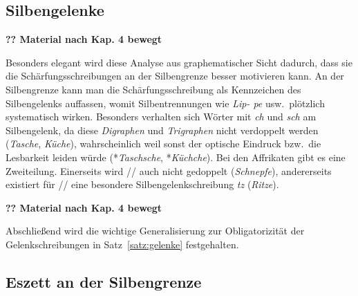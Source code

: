 \subsection{Silbengelenke}

\label{sec:silbengelenk}

\textbf{?? Material nach Kap. 4 bewegt}

Besonders elegant wird diese Analyse aus graphematischer Sicht dadurch, dass sie die Schärfungsschreibungen an der Silbengrenze besser motivieren kann.
An der Silbengrenze kann man die Schärfungsschreibung als Kennzeichen des Silbengelenks auffassen, womit Silbentrennungen wie \textit{Lip- pe} usw.\ plötzlich systematisch wirken.
Besonders verhalten sich Wörter mit \textit{ch} und \textit{sch} am Silbengelenk, da diese \textit{Digraphen} und \textit{Trigraphen} nicht verdoppelt werden (\textit{Tasche}, \textit{Küche}), wahrscheinlich weil sonst der optische Eindruck bzw.\ die Lesbarkeit leiden würde (*\textit{Taschsche}, *\textit{Küchche}).
Bei den Affrikaten gibt es eine Zweiteilung.
Einerseits wird // auch nicht gedoppelt (\textit{Schnepfe}), andererseits existiert für // eine besondere Silbengelenkschreibung \textit{tz} (\textit{Ritze}).


\textbf{?? Material nach Kap. 4 bewegt}

Abschließend wird die wichtige Generalisierung zur Obligatorizität der Gelenkschreibungen in Satz~\ref{satz:gelenke} festgehalten.


\subsection[Eszett an der Silbengrenze]{\Opsional Eszett an der Silbengrenze}

\label{sec:eszett}

